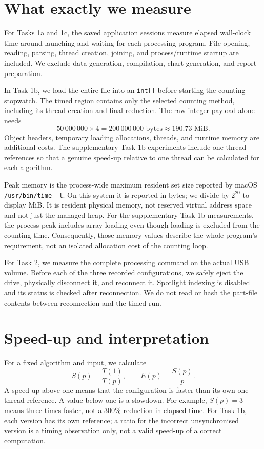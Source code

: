 \section{What exactly we measure}
For Tasks 1a and 1c, the saved application sessions measure elapsed wall-clock time around launching and waiting for each processing program. File opening, reading, parsing, thread creation, joining, and process/runtime startup are included. We exclude data generation, compilation, chart generation, and report preparation.

In Task 1b, we load the entire file into an \texttt{int[]} before starting the counting stopwatch. The timed region contains only the selected counting method, including its thread creation and final reduction. The raw integer payload alone needs
\begin{equation}
50\,000\,000\times4=200\,000\,000\text{ bytes}\approx190.73\text{ MiB}.
\end{equation}
Object headers, temporary loading allocations, threads, and runtime memory are additional costs. The supplementary Task 1b experiments include one-thread references so that a genuine speed-up relative to one thread can be calculated for each algorithm.

Peak memory is the process-wide maximum resident set size reported by macOS \texttt{/usr/bin/time -l}. On this system it is reported in bytes; we divide by \(2^{20}\) to display MiB. It is resident physical memory, not reserved virtual address space and not just the managed heap. For the supplementary Task 1b measurements, the process peak includes array loading even though loading is excluded from the counting time. Consequently, those memory values describe the whole program's requirement, not an isolated allocation cost of the counting loop.

For Task 2, we measure the complete processing command on the actual USB volume. Before each of the three recorded configurations, we safely eject the drive, physically disconnect it, and reconnect it. Spotlight indexing is disabled and its status is checked after reconnection. We do not read or hash the part-file contents between reconnection and the timed run.

\section{Speed-up and interpretation}
For a fixed algorithm and input, we calculate
\begin{equation}
S(p)=\frac{T(1)}{T(p)},\qquad E(p)=\frac{S(p)}{p}.
\end{equation}
A speed-up above one means that the configuration is faster than its own one-thread reference. A value below one is a slowdown. For example, \(S(p)=3\) means three times faster, not a 300\% reduction in elapsed time. For Task 1b, each version has its own reference; a ratio for the incorrect unsynchronised version is a timing observation only, not a valid speed-up of a correct computation.

